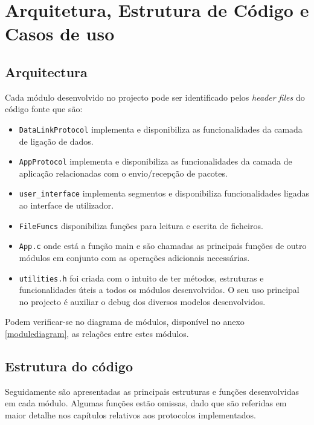 \documentclass[11pt,a4paper,reqno]{report}
\numberwithin{equation}{section}
\begin{document}
	
\chapter{Arquitetura, Estrutura de Código e Casos de uso}

\section{Arquitectura}

Cada módulo desenvolvido no projecto pode ser identificado pelos \emph{header files} do código fonte que são:
\begin{itemize}
\item \verb|DataLinkProtocol| implementa e disponibiliza as funcionalidades da camada de ligação de dados. 
\item \verb|AppProtocol| implementa e disponibiliza as funcionalidades da camada de aplicação relacionadas com o envio/recepção de pacotes.
\item \verb|user_interface| implementa segmentos e disponibiliza funcionalidades ligadas ao interface de utilizador. 
\item \verb|FileFuncs| disponibiliza funções para leitura e escrita de ficheiros. 
\item \verb|App.c| onde está a função main e são chamadas as principais funções de outro módulos em conjunto com as operações adicionais necessárias. 
\item \verb|utilities.h| foi criada com o intuito de ter métodos, estruturas e funcionalidades úteis a todos os módulos desenvolvidos. O seu uso principal no projecto é auxiliar o debug dos diversos modelos desenvolvidos.
\end{itemize}
Podem verificar-se no diagrama de módulos, disponível no anexo \ref{modulediagram}, as relações entre estes módulos.

\section{Estrutura do código}

Seguidamente são apresentadas as principais estruturas e funções desenvolvidas em cada módulo. Algumas funções estão omissas, dado que são referidas em maior detalhe nos capítulos relativos aos protocolos implementados.
\end{document}
